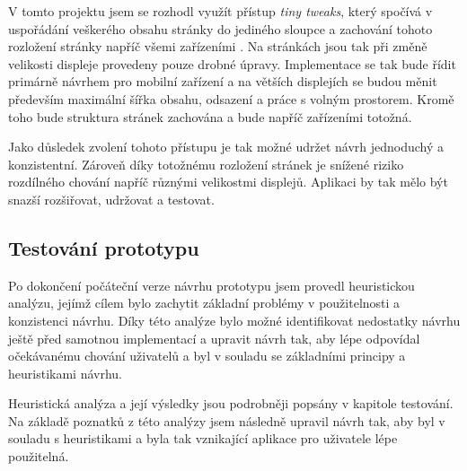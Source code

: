 V tomto projektu jsem se rozhodl využít přístup \textit{tiny tweaks}, který spočívá v uspořádání veškerého obsahu stránky do jediného sloupce a zachování tohoto rozložení stránky napříč všemi zařízeními \cite[10]{NURResponsiveDesign}. Na stránkách jsou tak při změně velikosti displeje provedeny pouze drobné úpravy. Implementace se tak bude řídit primárně návrhem pro mobilní zařízení a na větších displejích se budou měnit především maximální šířka obsahu, odsazení a práce s volným prostorem. Kromě toho bude struktura stránek zachována a bude napříč zařízeními totožná.

Jako důsledek zvolení tohoto přístupu je tak možné udržet návrh jednoduchý a konzistentní. Zároveň díky totožnému rozložení stránek je snížené riziko rozdílného chování napříč různými velikostmi displejů. Aplikaci by tak mělo být snazší rozšiřovat, udržovat a testovat.

\subsection{Testování prototypu}

Po dokončení počáteční verze návrhu prototypu jsem provedl heuristickou analýzu, jejímž cílem bylo zachytit základní problémy v použitelnosti a konzistenci návrhu. Díky této analýze bylo možné identifikovat nedostatky návrhu ještě před samotnou implementací a upravit návrh tak, aby lépe odpovídal očekávanému chování uživatelů a byl v souladu se základními principy a heuristikami návrhu. \cite{Nielsen10Heuristics}

Heuristická analýza a její výsledky jsou podrobněji popsány v kapitole testování. Na základě poznatků z této analýzy jsem následně upravil návrh tak, aby byl v souladu s heuristikami a byla tak vznikající aplikace pro uživatele lépe použitelná.
